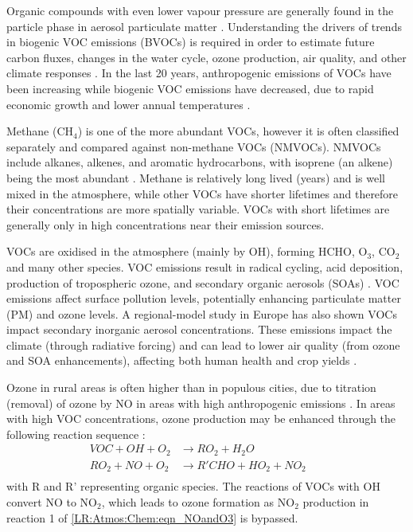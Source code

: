   Organic compounds with even lower vapour pressure are generally found in the particle phase in aerosol particulate matter \parencite{Glasius2016}.
  Understanding the drivers of trends in biogenic VOC emissions (BVOCs) is required in order to estimate future carbon fluxes, changes in the water cycle, ozone production, air quality, and other climate responses \parencite{Yue2015}.
  In the last 20 years, anthropogenic emissions of VOCs have been increasing while biogenic VOC emissions have decreased, due to rapid economic growth and lower annual temperatures \parencite{Stavrakou2014, Kwon2017}.
  
  Methane (CH$_4$) is one of the more abundant VOCs, however it is often classified separately and compared against non-methane VOCs (NMVOCs).
  NMVOCs include alkanes, alkenes, and aromatic hydrocarbons, with isoprene (an alkene) being the most abundant \parencite{Guenther1995}.
  Methane is relatively long lived (years) and is well mixed in the atmosphere, while other VOCs have shorter lifetimes and therefore their concentrations are more spatially variable.
  VOCs with short lifetimes are generally only in high concentrations near their emission sources.
  
  VOCs are oxidised in the atmosphere (mainly by OH), forming HCHO, O$_3$, CO$_2$ and many other species.
  VOC emissions result in radical cycling, acid deposition, production of tropospheric ozone, and secondary organic aerosols (SOAs) \parencite{Atkinson2000, Kanakidou2005}.
  VOC emissions affect surface pollution levels, potentially enhancing particulate matter (PM) and ozone levels.
  A regional-model study in Europe \parencite{Aksoyoglu2017} has also shown VOCs impact secondary inorganic aerosol concentrations.
  These emissions impact the climate (through radiative forcing) and can lead to lower air quality (from ozone and SOA enhancements), affecting both human health and crop yields \parencite{IPCC_Chapter2, Avnery2011, Lelieveld2015}.
  
  Ozone in rural areas is often higher than in populous cities, due to titration (removal) of ozone by NO in areas with high anthropogenic emissions \parencite{Cooper2014,Monks2015}.
  In areas with high VOC concentrations, ozone production may be enhanced through the following reaction sequence \parencite{Sillman1999}:
  \begin{equation}
    \begin{aligned}
      VOC + OH + O_2   & \to RO_2 + H_2O       && \\%
      RO_2 + NO + O_2  & \to R'CHO+HO_2+NO_2   && \\%
    \end{aligned}
    \label{LR:VOCs:eqn_VOCandNO}
  \end{equation}
  with R and R' representing organic species.
  The reactions of VOCs with OH convert NO to NO$_2$, which leads to ozone formation as NO$_2$ production in reaction 1 of \ref{LR:Atmos:Chem:eqn_NOandO3} is bypassed.
  
